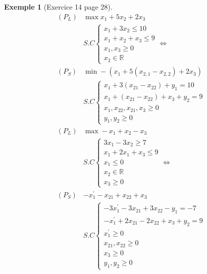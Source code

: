 \documentclass{article}
\theoremstyle{plain}%
\theoremstyle{definition}
\newtheorem{exmp}{Exemple}[section]
\theoremstyle{remark}
\begin{document}
\begin{exmp}[Exercice 14 page 28]
    \begin{align*}
        (P_L) &\max x_1 + 5x_2 + 2x_3 \\ 
            & S.C \begin{cases}
                x_1 + 3x_2 \leq 10 \\
                x_1 + x_2 + x_3 \leq 9 \\
                x_1, x_3 \geq 0 \\ 
                x_2 \in \mathbb{R}
            \end{cases} \Leftrightarrow \\
        (P_S) &\min -(x_1 + 5(x_{2,1} - x_{2,2} ) + 2 x_3) \\
            & S.C \begin{cases}
                x_1 + 3 (x_{21} - x_{22} ) + y_1 = 10 \\
                x_1 + (x_{21} - x_{22}) + x_3 + y_2 = 9 \\
                x_1 , x_{22} , x_{21} , x_3 \geq 0 \\
                y_1, y_2 \geq 0
            \end{cases}
    \end{align*}
    \begin{align*}
        (P_L) &\max -x_1 + x_2 - x_3\\ 
            & S.C \begin{cases}
                3x_1 - 3 x_2 \geq 7 \\
                x_1 + 2x_1 + x_3 \leq 9 \\
                x_1 \leq 0 \\
                x_2 \in \mathbb{R} \\
                x_3 \geq 0
            \end{cases} \Leftrightarrow \\
        (P_S) &  -x_1^\prime - x_{21} + x_{22} + x_3 \\
            & S.C \begin{cases}
                -3 x_1^\prime - 3 x_{21} + 3x_{22} - y_1 = -7 \\
                -x_1^\prime + 2 x_{21} - 2 x_{22} + x_3 + y_2 = 9 \\
                x_1^\prime \geq 0 \\
                x_{21}, x_{22} \geq 0 \\
                x_3 \geq 0 \\
                y_1 , y_2 \geq 0
            \end{cases}
    \end{align*}
\end{exmp}
\end{document}
